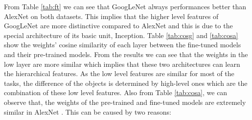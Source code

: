 From Table \ref{tab:ft} we can see that GoogLeNet always performances better than AlexNet on both datasets. This implies that the higher level features of GoogLeNet are more distinctive compared to AlexNet and this is due to the special architecture of its basic unit, Inception. Table \ref{tab:cosg} and \ref{tab:cosa} show the weights' cosine similarity of each layer between the fine-tuned models and their pre-trained models. From the results we can see that the weights in the low layer are more similar which implies that these two architectures can learn the hierarchical features. As the low level features are similar for most of the tasks, the difference of the objects is determined by high-level ones which are the combination of these low level features. Also from Table \ref{tab:cosa}, we can observe that, the weights of the pre-trained and fine-tuned models are extremely similar in AlexNet . This can be caused by two reasons:
